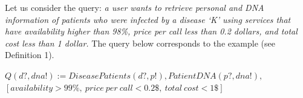 
Let us consider the query: \textit{a user wants to retrieve personal and DNA information of patients who were infected by a disease `K' using services that have availability higher than 98\%, price per call less than 0.2 dollars, and total cost less than 1 dollar.} 
The query below corresponds to the example (see Definition 1).

\begin{small}
\begin{center}
$Q (d?, dna!) := DiseasePatients(d?, p!), PatientDNA(p?, dna!),$ \\
$[availability > 99\%, \ price \ per \ call < 0.2\$, \ total \ cost < 1\$]$
\end{center} 
\end{small}


